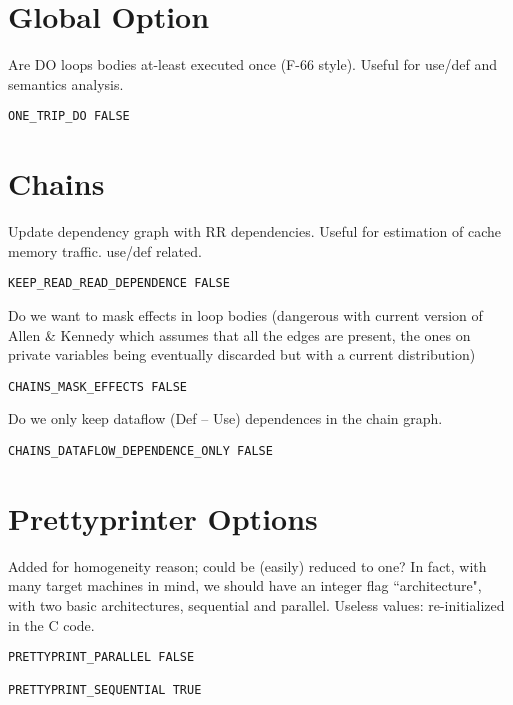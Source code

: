 \section{Global Option}

Are DO loops bodies at-least executed once (F-66 style).
Useful for use/def and semantics analysis.

\begin{verbatim}
ONE_TRIP_DO FALSE
\end{verbatim}

\section{Chains}

Update dependency graph with RR dependencies.
Useful for estimation of cache memory traffic. use/def related.

\begin{verbatim}
KEEP_READ_READ_DEPENDENCE FALSE
\end{verbatim}

Do we want to mask effects in loop bodies (dangerous with current
version of Allen \& Kennedy which assumes that all the edges are
present, the ones on private variables being eventually discarded
but with a current distribution)

\begin{verbatim}
CHAINS_MASK_EFFECTS FALSE
\end{verbatim}

Do we only keep dataflow (Def -- Use) dependences in the chain graph.

\begin{verbatim}
CHAINS_DATAFLOW_DEPENDENCE_ONLY FALSE
\end{verbatim}

\section{Prettyprinter Options}

Added for homogeneity reason; could be (easily) reduced to one?  In
fact, with many target machines in mind, we should have an integer flag
``architecture", with two basic architectures, sequential and parallel.
Useless values: re-initialized in the C code.

\begin{verbatim}
PRETTYPRINT_PARALLEL FALSE

PRETTYPRINT_SEQUENTIAL TRUE
\end{verbatim}

